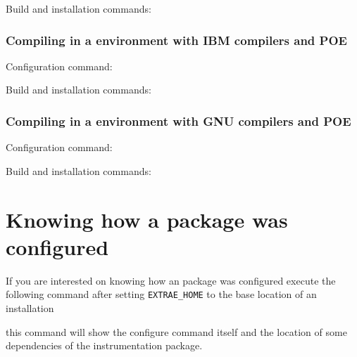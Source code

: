 Build and installation commands:


\subsubsection{Compiling in a environment with IBM compilers and POE}

Configuration command:


Build and installation commands:


\subsubsection{Compiling in a environment with GNU compilers and POE}

Configuration command:


Build and installation commands:


\section{Knowing how a package was configured}

If you are interested on knowing how an \TRACE package was configured execute the following command after setting {\tt EXTRAE\_HOME} to the base location of an installation


this command will show the configure command itself and the location of some dependencies of the instrumentation package.
